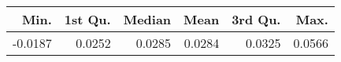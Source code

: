 \begin{table}[ht]
\centering
\begin{tabular}{rrrrrr}
  \hline
Min. & 1st Qu. & Median & Mean & 3rd Qu. & Max. \\ 
  \hline
-0.0187 & 0.0252 & 0.0285 & 0.0284 & 0.0325 & 0.0566 \\ 
   \hline
\end{tabular}
\end{table}
